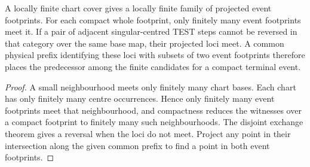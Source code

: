 \begin{theorem}
\label{hir:g8-spatial-dependency-branching}
\leanok
A locally finite chart cover gives a locally finite family of
projected event footprints. For each compact whole footprint,
only finitely many event footprints meet it. If a pair of adjacent
singular-centred TEST steps cannot be reversed in that category over
the same base map, their projected loci meet. A common physical
prefix identifying these loci with subsets of two event footprints
therefore places the predecessor among the finite candidates for a
compact terminal event.
\end{theorem}
\begin{proof}
A small neighbourhood meets only finitely many chart bases. Each
chart has only finitely many centre occurrences. Hence only finitely
many event footprints meet that neighbourhood, and compactness
reduces the witnesses over a compact footprint to finitely many such
neighbourhoods. The disjoint exchange theorem gives a reversal when
the loci do not meet. Project any point in their intersection along
the given common prefix to find a point in both event footprints.
\end{proof}

